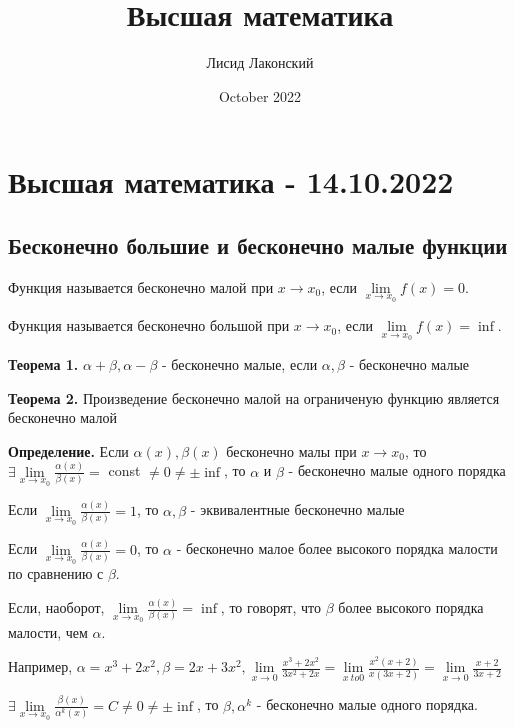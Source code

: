 \documentclass{article}
\title{Высшая математика}
\author{Лисид Лаконский}
\date{October 2022}
\begin{document}
\maketitle

\tableofcontents
\pagebreak

\section{Высшая математика - 14.10.2022}

\subsection{Бесконечно большие и бесконечно малые функции}

\begin{flushleft}

Функция называется бесконечно малой при $x \to x_0$, если $\lim\limits_{x \to x_0} f(x) = 0$.

Функция называется бесконечно большой при $x \to x_0$, если $\lim\limits_{x \to x_0} f(x) = \inf$.

\textbf{Теорема 1.} $\alpha + \beta, \alpha - \beta$ - бесконечно малые, если $\alpha, \beta$ - бесконечно малые

\textbf{Теорема 2.} Произведение бесконечно малой на ограниченую функцию является бесконечно малой

\textbf{Определение.} Если $\alpha(x), \beta(x)$ бесконечно малы при $x \to x_0$, то $\exists \lim\limits_{x \to x_0} \frac{\alpha(x)}{\beta(x)} = $ const $ \ne 0 \ne \pm \inf$, то $\alpha$ и $\beta$ - бесконечно малые одного порядка

Если $\lim\limits_{x \to x_0} \frac{\alpha(x)}{\beta(x)} = 1$, то $\alpha, \beta$ - эквивалентные бесконечно малые

\hfill

Если $\lim\limits_{x \to x_0} \frac{\alpha(x)}{\beta(x)} = 0$, то $\alpha$ - бесконечно малое более высокого порядка малости по сравнению с $\beta$.

Если, наоборот, $\lim\limits_{x \to x_0} \frac{\alpha(x)}{\beta(x)} = \inf$, то говорят, что $\beta$ более высокого порядка малости, чем $\alpha$.

Например, $\alpha = x^3 + 2x^2, \beta = 2x + 3x^2, \lim\limits_{x \to 0} \frac{x^3 + 2x^2}{3x^2 + 2x} = \lim\limits_{x \ to 0} \frac{x^2(x+2)}{x(3x + 2)} = \lim\limits_{x \to 0} \frac{x + 2}{3x + 2}$

\hfill

$\exists \lim\limits_{x \to x_0} \frac{\beta(x)}{\alpha^k(x)} = C \ne 0 \ne \pm \inf$, то $\beta, \alpha^k$ - бесконечно малые одного порядка.


\end{flushleft}
\end{document}
